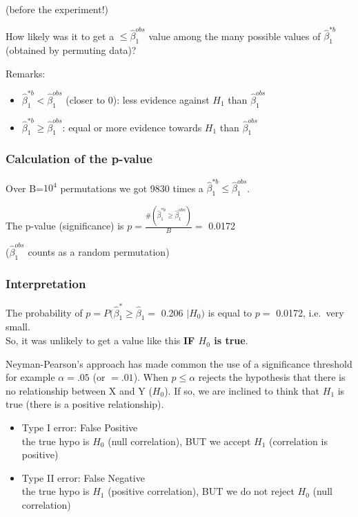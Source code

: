 \documentclass[
]{article}
\providecommand{\tightlist}{%
  \setlength{\itemsep}{0pt}\setlength{\parskip}{0pt}}
\begin{document}
(before the experiment!)

How likely was it to get a \(\leq \hat{\beta}_1 ^{obs}\) value among the
many possible values of \(\hat{\beta}_1 ^{*b}\) (obtained by permuting
data)?

Remarks:

\begin{itemize}
\tightlist
\item
  \(\hat{\beta}_1 ^{* b}< \hat{\beta}_1 ^{obs}\) (closer to 0): less
  evidence against \(H_1\) than \(\hat{\beta}_1 ^{obs}\)
\item
  \(\hat{\beta}_1 ^{* b} \geq \hat{\beta}_1 ^{obs}\): equal or more
  evidence towards \(H_1\) than \(\hat{\beta}_1 ^{obs}\)
\end{itemize}

\hypertarget{calculation-of-the-p-value}{%
\subsubsection{Calculation of the
p-value}\label{calculation-of-the-p-value}}

Over B=\ensuremath{10^{4}} permutations we got 9830 times a
\(\hat{\beta}_1 ^{* b} \leq \hat{\beta}_1 ^{obs}\).

The p-value (significance) is
\(p=\frac{\# (\hat{\beta}_1 ^{* b} \geq \hat{\beta}_1 ^{obs})}{B} =\)
0.0172

(\(\hat{\beta}_1 ^{obs}\) counts as a random permutation)

\hypertarget{interpretation}{%
\subsubsection{Interpretation}\label{interpretation}}

The probability of \(p=P (\hat{\beta}_1 ^ * \geq \hat{\beta}_1=\) 0.206
\(| H_0)\) is equal to \(p =\) 0.0172, i.e.~very small.\\
So, it was unlikely to get a value like this \textbf{IF \(H_0\) is
true}.

Neyman-Pearson's approach has made common the use of a significance
threshold for example \(\alpha=.05\) (or \(=. 01\)). When
\(p \leq \alpha\) rejects the hypothesis that there is no relationship
between X and Y (\(H_0\)). If so, we are inclined to think that \(H_1\)
is true (there is a positive relationship).

\begin{itemize}
\tightlist
\item
  Type I error: False Positive\\
  the true hypo is \(H_0\) (null correlation), BUT we accept \(H_1\)
  (correlation is positive)
\item
  Type II error: False Negative\\
  the true hypo is \(H_1\) (positive correlation), BUT we do not reject
  \(H_0\) (null correlation)
\end{itemize}
\end{document}
